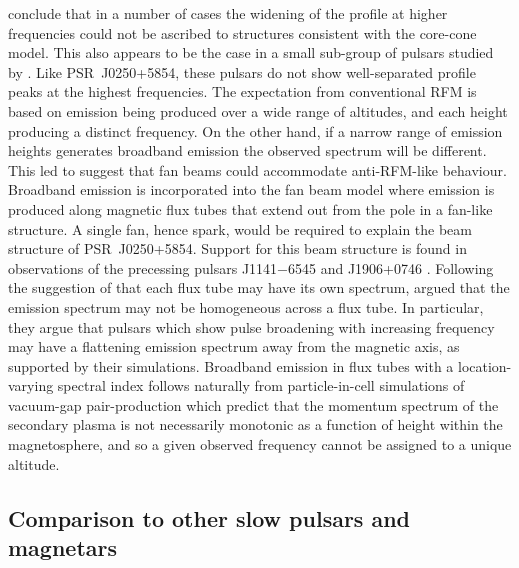 \citet{CWxx2014} conclude that in a number of cases the widening of the profile at higher frequencies could not be ascribed to structures consistent with the core-cone model. This also appears to be the case in a small sub-group of pulsars studied by \citet{PHS+2016}. Like PSR~J0250+5854, these pulsars do not show well-separated profile peaks at the highest frequencies. The expectation from conventional RFM is based on emission being produced over a wide range of altitudes, and each height producing a distinct frequency. On the other hand, if a narrow range of emission heights generates broadband emission the observed spectrum will be different. This led \citet{CWxx2014} to suggest that fan beams could accommodate anti-RFM-like behaviour. Broadband emission is incorporated into the fan beam model \citep{Mxxx1987, DRDx2010, DRxx2012, DRxx2013, WPZ+2014} where emission is produced along magnetic flux tubes that extend out from the pole in a fan-like structure. A single fan, hence spark, would be required to explain the beam structure of PSR~J0250+5854. Support for this beam structure is found in observations of the precessing pulsars J1141$-$6545 and J1906+0746 \citep{MKS+2010, DKC+2013}. Following the suggestion of \citet{Mxxx1987} that each flux tube may have its own spectrum, \citet{CWC+2007} argued that the emission spectrum may not be homogeneous across a flux tube. In particular, they argue that pulsars which show pulse broadening with increasing frequency may have a flattening emission spectrum away from the magnetic axis, as supported by their simulations. Broadband emission in flux tubes with a location-varying spectral index follows naturally from particle-in-cell simulations of vacuum-gap pair-production \citep{Txxx2010} which predict that the momentum spectrum of the secondary plasma is not necessarily monotonic as a function of height within the magnetosphere, and so a given observed frequency cannot be assigned to a unique altitude.


















\subsection{Comparison to other slow pulsars and magnetars}
\label{sec: J0250 - discussion - magnetar comparison}

